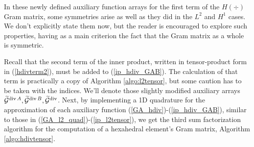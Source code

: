 In these newly defined auxiliary function arrays for the first term of the $H(\div)$ Gram matrix, some symmetries arise as well as they did in the $L^2$ and $H^1$ cases. We don't explicitly state them now, but the reader is encouraged to explore such properties, having as a main criterion the fact that the Gram matrix as a whole is symmetric.

Recall that the second term of the inner product, written in tensor-product form in (\ref{hdivterm2}), must be added to (\ref{ip_hdiv_GAB}). The calculation of that term is practically a copy of Algorithm \ref{algo:l2tensor}, but some caution has to be taken with the indices. We'll denote those slightly modified auxiliary arrays $\widetilde{\mathcal{G}}^{\operatorname{div} A},\widetilde{\mathcal{G}}^{\operatorname{div} B},\widetilde{\mathcal{G}}^{\operatorname{div}}$. Next, by implementing a 1D quadrature for the approximation of each auxiliary function (\ref{GA_hdiv})-(\ref{ip_hdiv_GAB}), similar to those in (\ref{GA_l2_quad})-(\ref{ip_l2tensor}), we get the third sum factorization algorithm for the computation of a hexahedral element's Gram matrix, Algorithm \ref{algo:hdivtensor}.
% 
